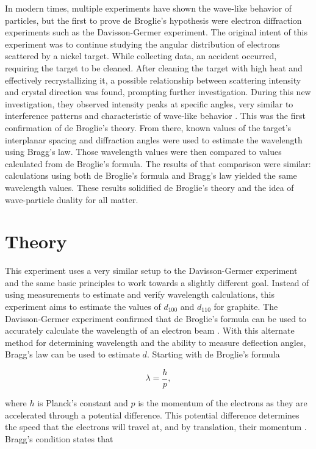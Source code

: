 \documentclass[rc,ec]{physicsinprogress}
\begin{document}
In modern times, multiple experiments have shown the wave-like behavior of particles, but the first to prove de Broglie's hypothesis were electron diffraction experiments such as the Davisson-Germer experiment. The original intent of this experiment was to continue studying the angular distribution of electrons scattered by a nickel target. While collecting data, an accident occurred, requiring the target to be cleaned. After cleaning the target with high heat and effectively recrystallizing it, a possible relationship between scattering intensity and crystal direction was found, prompting further investigation. During this new investigation, they observed intensity peaks at specific angles, very similar to interference patterns and characteristic of wave-like behavior \cite{Davisson1927}. This was the first confirmation of de Broglie's theory. From there, known values of the target's interplanar spacing and diffraction angles were used to estimate the wavelength using Bragg's law. Those wavelength values were then compared to values calculated from de Broglie's formula. The results of that comparison were similar: calculations using both de Broglie's formula and Bragg's law yielded the same wavelength values. These results solidified de Broglie's theory and the idea of wave-particle duality for all matter.





\section{Theory}



This experiment uses a very similar setup to the Davisson-Germer experiment and the same basic principles to work towards a slightly different goal. Instead of using measurements to estimate and verify wavelength calculations, this experiment aims to estimate the values of $d_{100}$ and $d_{110}$ for graphite. The Davisson-Germer experiment confirmed that de Broglie's formula can be used to accurately calculate the wavelength of an electron beam \cite{Broglie1924}. With this alternate method for determining wavelength and the ability to measure deflection angles, Bragg's law can be used to estimate $d$. Starting with de Broglie's formula


\begin{equation}
\lambda = \frac{h}{p},
\label{dbwl}
\end{equation}

where $h$ is Planck's constant and $p$ is the momentum of the electrons as they are accelerated through a potential difference. This potential difference determines the speed that the electrons will travel at, and by translation, their momentum \cite{Davisson1927}. Bragg's condition states that
\end{document}
